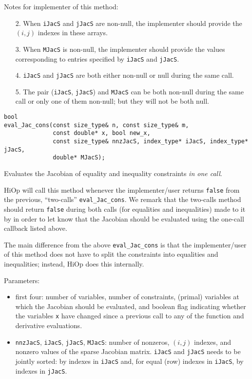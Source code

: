Notes for implementer of this method: 
\begin{itemize}
\item[2.] When \texttt{iJacS} and \texttt{jJacS} are non-null, the implementer should provide the $(i,j)$   indexes in these arrays. 
\item[3.] When \texttt{MJacS} is non-null, the implementer should provide the values corresponding to    entries specified by \texttt{iJacS} and \texttt{jJacS}.
\item[4.] \texttt{iJacS} and \texttt{jJacS} are both either non-null or null during the same call.
\item[5.] The pair (\texttt{iJacS}, \texttt{jJacS}) and \texttt{MJacS} can be both non-null during the same call or only one of them  non-null; but they will not be both null.
\end{itemize}

\begin{lstlisting}
bool
eval_Jac_cons(const size_type& n, const size_type& m, 
              const double* x, bool new_x,
              const size_type& nnzJacS, index_type* iJacS, index_type* jJacS,
              double* MJacS);
\end{lstlisting} 

\noindent Evaluates the Jacobian of equality and inequality constraints \textit{in one call}. 
   
   HiOp will call this method whenever the implementer/user returns \texttt{false} from the previous, ``two-calls'' \texttt{eval\_Jac\_cons}. We remark that the two-calls method should return  \texttt{false} during both calls (for equalities and inequalities) made to it by \Hi in order to let \Hi know that the Jacobian should be evaluated using the one-call callback listed above.
   
   
   
The main difference from the above \texttt{eval\_Jac\_cons} is that the implementer/user of this 
    method does not have to split the constraints into equalities and inequalities; instead,
    HiOp does this internally.
   
 
   Parameters:
    \begin{itemize}
    \item  first four: number of variables, number of constraints, (primal) variables at which the
    Jacobian should be evaluated, and boolean flag indicating whether the variables \texttt{x} have
    changed since a previous call to any of the function and derivative evaluations.
     \item   \texttt{nnzJacS}, \texttt{iJacS}, \texttt{jJacS}, \texttt{MJacS}: number of nonzeros, $(i,j)$ indexes, and nonzero values of 
   the sparse Jacobian matrix.  \texttt{iJacS} and \texttt{jJacS} needs to be jointly sorted: by indexes in \texttt{iJacS} and, for equal (row) indexes in \texttt{iJacS}, by indexes in \texttt{jJacS}.
    \end{itemize}
   
